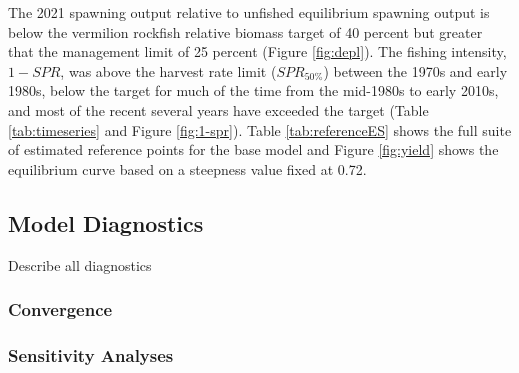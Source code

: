 \documentclass[11pt,
  english,
  a4paper,
]{article}
\begin{document}

The 2021 spawning output relative to unfished equilibrium spawning output is below the vermilion rockfish relative biomass target of 40 percent but greater that the management limit of 25 percent (Figure \ref{fig:depl}). The fishing intensity, {\(1-SPR\)\leavevmode\tagmcend\tagstructend}, was above the harvest rate limit ({\(SPR_{50\%}\)\leavevmode\tagmcend\tagstructend}) between the 1970s and early 1980s, below the target for much of the time from the mid-1980s to early 2010s, and most of the recent several years have exceeded the target (Table \ref{tab:timeseries} and Figure \ref{fig:1-spr}). Table \ref{tab:referenceES} shows the full suite of estimated reference points for the base model and Figure \ref{fig:yield} shows the equilibrium curve based on a steepness value fixed at 0.72.

\leavevmode\tagmcend\tagstructend\par


\hypertarget{model-diagnostics}{%
\subsection{Model Diagnostics}\label{model-diagnostics}}

\leavevmode\tagmcend\tagstructend


Describe all diagnostics

\leavevmode\tagmcend\tagstructend\par


\hypertarget{convergence}{%
\subsubsection{Convergence}\label{convergence}}

\leavevmode\tagmcend\tagstructend


\hypertarget{sensitivity-analyses}{%
\subsubsection{Sensitivity Analyses}\label{sensitivity-analyses}}
\end{document}
